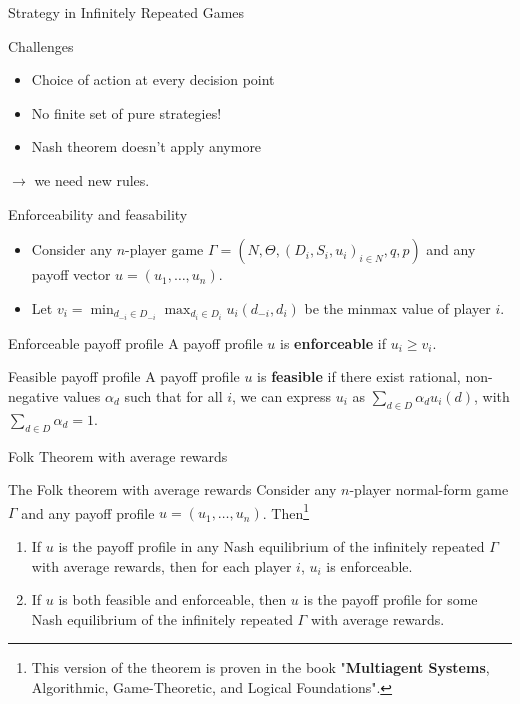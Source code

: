 \begin{frame}{Strategy in Infinitely Repeated Games}
    \begin{alertblock}{Challenges}
        \begin{itemize}
            \item Choice of action at every decision point
            \item No finite set of pure strategies!
            \item Nash theorem doesn't apply anymore
        \end{itemize}
        $\rightarrow$ we need new rules.
    \end{alertblock}
\end{frame}

\begin{frame}{Enforceability and feasability}
    \begin{itemize}
        \item Consider any $n$-player game $\Gamma = (N, \Theta, (D_i, S_i, u_i)_{i\in N}, q, p)$ and any payoff vector
        $u = (u_1, \dots, u_n)$.
        \item Let $v_i= \min_{d_{-i}\in D_{-i}} \max_{d_i\in D_i} u_i(d_{-i}, d_i)$ be
        the minmax value of player $i$.
    \end{itemize}

    \begin{block}{Enforceable payoff profile}
        A payoff profile $u$ is \textbf{enforceable} if $u_i \geq v_i$.
    \end{block}

    \begin{block}{Feasible payoff profile}
        A payoff profile $u$ is \textbf{feasible} if there exist rational, non-negative
        values $\alpha_d$ such that for all $i$, we can express $u_i$ as
        $\sum_{d\in D} \alpha_d u_i(d)$, with $\sum_{d\in D} \alpha_d = 1$.
    \end{block}
\end{frame}

\begin{frame}{Folk Theorem with average rewards}

    \begin{block}{The Folk theorem with average rewards}
        Consider any $n$-player normal-form game $\Gamma$ and any payoff profile
        $u = (u_1, \dots, u_n)$. Then\footnote{This version of the theorem is proven
        in the book "\textbf{Multiagent Systems}, Algorithmic, Game-Theoretic, and Logical
        Foundations".}
        \begin{enumerate}
            \item If $u$ is the payoff profile in any Nash equilibrium of the infinitely
            repeated $\Gamma$ with average rewards, then for each player $i$, $u_i$ is enforceable.
            \item If $u$ is both feasible and enforceable, then $u$ is the payoff profile for some
            Nash equilibrium of the infinitely repeated $\Gamma$ with average rewards.
        \end{enumerate}
    \end{block}
\end{frame}

